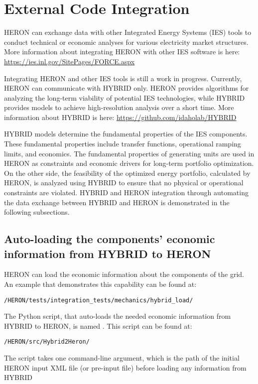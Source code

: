 \section{External Code Integration}
HERON can exchange data with other Integrated Energy Systems (IES) tools to conduct technical or economic analyses for various electricity market structures. More information about integrating HERON with other IES software is here: \url{https://ies.inl.gov/SitePages/FORCE.aspx}

Integrating HERON and other IES tools is still a work in progress. Currently, HERON can communicate with HYBRID only. HERON provides algorithms for analyzing the long-term viability of potential IES technologies, while HYBRID provides models to achieve high-resolution analysis over a short time. More information about HYBRID is here: \url{https://github.com/idaholab/HYBRID}


HYBRID models determine the fundamental properties of the IES components. These fundamental properties include transfer functions, operational ramping limits, and economics. The fundamental properties of generating units are used in HERON as constraints and economic drivers for long-term portfolio optimization. On the other side, the feasibility of the optimized energy portfolio, calculated by HERON, is analyzed using HYBRID to ensure that no physical or operational constraints are violated. HYBRID and HERON integration through automating the data exchange between HYBRID and HERON is demonstrated in the following subsections.

\subsection{Auto-loading the components' economic information from HYBRID to HERON}
HERON can load the economic information about the components of the grid. An example that demonstrates this capability can be found at: 
\begin{lstlisting}
/HERON/tests/integration_tests/mechanics/hybrid_load/
\end{lstlisting}

The Python script, that auto-loads the needed economic information from HYBRID to HERON, is named . This script can be found at:
\begin{lstlisting}
/HERON/src/Hybrid2Heron/
\end{lstlisting}


The  script takes one command-line argument, which is the path of the initial HERON input XML file (or pre-input file) before loading any information from HYBRID

